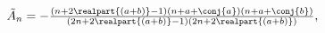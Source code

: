 $\tilde{A}_{n}=-\frac{(n+2\realpart{(a+b)}-1)(n+a+\conj{a})(n+a+\conj{b})}{(2n+%
2\realpart{(a+b)}-1)(2n+2\realpart{(a+b)})},$